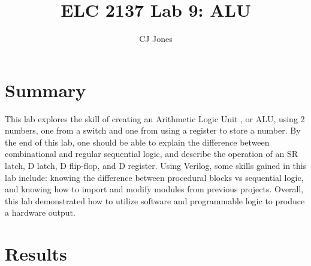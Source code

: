\documentclass[11pt]{article}
\begin{document}
\title{ELC 2137 Lab 9: ALU}
\author{CJ Jones}

\maketitle


\section*{Summary}

This lab explores the skill of creating an Arithmetic Logic Unit , or ALU, using 2 numbers, one from a switch and one from using a register to store a number. By the end of this lab, one should be able to explain the difference between combinational and regular sequential logic, and describe the operation of an SR latch, D latch, D flip-flop, and D register. Using Verilog, some skills gained in this lab include: knowing the difference between procedural blocks vs sequential logic, and knowing how to import and modify modules from previous projects. Overall, this lab demonstrated how to utilize software and programmable logic to produce a hardware output.













\section*{Results}
\end{document}
